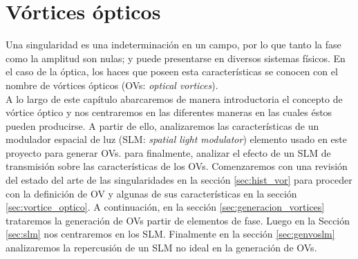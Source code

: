 \chapter{Vórtices ópticos}
\label{cap:vortices}

Una singularidad es una indeterminación en un campo, por lo que tanto la fase como la amplitud son nulas; y puede presentarse en diversos sistemas físicos. En el caso de la óptica, los haces que poseen esta características se conocen con el nombre de vórtices ópticos (OVs: \textit{optical vortices}).\\

A lo largo de este capítulo abarcaremos de manera introductoria el concepto de vórtice óptico y nos centraremos en las diferentes maneras en las cuales éstos pueden producirse. A partir de ello, analizaremos las características de un modulador espacial de luz (SLM: \textit{spatial light modulator}) elemento usado en este proyecto para generar OVs. para finalmente, analizar el efecto de un SLM de transmisión sobre las características de los OVs. Comenzaremos con una revisión del estado del arte de las singularidades en la sección \ref{sec:hist_vor} para proceder con la definición de OV y algunas de sus características en la sección \ref{sec:vortice_optico}. A continuación, en la sección \ref{sec:generacion_vortices} trataremos la generación de OVs partir de elementos de fase. Luego en la Sección \ref{sec:slm} nos centraremos en los SLM. Finalmente en la sección \ref{sec:genvoslm} analizaremos la repercusión de un SLM no ideal en la generación de OVs.



